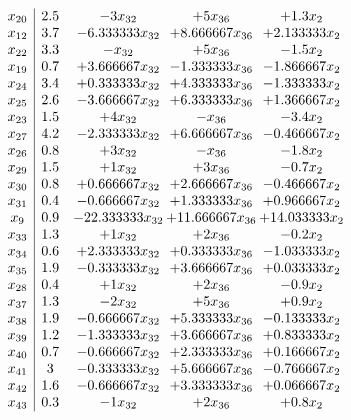 \documentclass[11pt]{article}
\begin{document}
\[\begin{array}{c| c c@{\hskip 2pt} c@{\hskip 2pt} c@{\hskip 2pt} }
 x_{20}   &  2.5 & -3 x_{32} & + 5 x_{36} & + 1.3 x_{2}\\
 x_{12}   &  3.7 & -6.333333 x_{32} & + 8.666667 x_{36} & + 2.133333 x_{2}\\
 x_{22}   &  3.3 & - x_{32} & + 5 x_{36} & -1.5 x_{2}\\
 x_{19}   &  0.7 & + 3.666667 x_{32} & -1.333333 x_{36} & -1.866667 x_{2}\\
 x_{24}   &  3.4 & + 0.333333 x_{32} & + 4.333333 x_{36} & -1.333333 x_{2}\\
 x_{25}   &  2.6 & -3.666667 x_{32} & + 6.333333 x_{36} & + 1.366667 x_{2}\\
 x_{23}   &  1.5 & + 4 x_{32} & - x_{36} & -3.4 x_{2}\\
 x_{27}   &  4.2 & -2.333333 x_{32} & + 6.666667 x_{36} & -0.466667 x_{2}\\
 x_{26}   &  0.8 & + 3 x_{32} & - x_{36} & -1.8 x_{2}\\
 x_{29}   &  1.5 & + 1 x_{32} & + 3 x_{36} & -0.7 x_{2}\\
 x_{30}   &  0.8 & + 0.666667 x_{32} & + 2.666667 x_{36} & -0.466667 x_{2}\\
 x_{31}   &  0.4 & -0.666667 x_{32} & + 1.333333 x_{36} & + 0.966667 x_{2}\\
 x_{9}   &  0.9 & -22.333333 x_{32} & + 11.666667 x_{36} & + 14.033333 x_{2}\\
 x_{33}   &  1.3 & + 1 x_{32} & + 2 x_{36} & -0.2 x_{2}\\
 x_{34}   &  0.6 & + 2.333333 x_{32} & + 0.333333 x_{36} & -1.033333 x_{2}\\
 x_{35}   &  1.9 & -0.333333 x_{32} & + 3.666667 x_{36} & + 0.033333 x_{2}\\
 x_{28}   &  0.4 & + 1 x_{32} & + 2 x_{36} & -0.9 x_{2}\\
 x_{37}   &  1.3 & -2 x_{32} & + 5 x_{36} & + 0.9 x_{2}\\
 x_{38}   &  1.9 & -0.666667 x_{32} & + 5.333333 x_{36} & -0.133333 x_{2}\\
 x_{39}   &  1.2 & -1.333333 x_{32} & + 3.666667 x_{36} & + 0.833333 x_{2}\\
 x_{40}   &  0.7 & -0.666667 x_{32} & + 2.333333 x_{36} & + 0.166667 x_{2}\\
 x_{41}   &  3 & -0.333333 x_{32} & + 5.666667 x_{36} & -0.766667 x_{2}\\
 x_{42}   &  1.6 & -0.666667 x_{32} & + 3.333333 x_{36} & + 0.066667 x_{2}\\
 x_{43}   &  0.3 & -1 x_{32} & + 2 x_{36} & + 0.8 x_{2}\\

\end{array}\]
\end{document}
